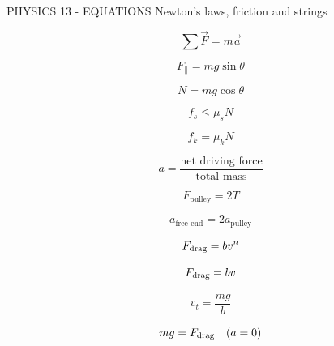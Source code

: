 PHYSICS 13 - EQUATIONS
Newton's laws, friction and strings

$$\sum \vec F = m\vec a$$

$$F_\parallel = mg\sin\theta$$

$$N = mg\cos\theta$$

$$f_s \le \mu_s N$$

$$f_k = \mu_k N$$

$$a = \frac{\text{net driving force}}{\text{total mass}}$$

$$F_{\text{pulley}} = 2T$$

$$a_{\text{free end}} = 2 a_{\text{pulley}}$$


$$F_{\rm drag}=bv^n$$

$$F_{\rm drag}=bv$$

$$v_t=\frac{mg}{b}$$

$$mg=F_{\rm drag}\quad (a=0)$$
